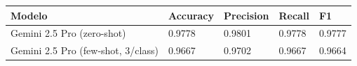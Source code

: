 \begin{tabular}{lllll}
\toprule
Modelo & Accuracy & Precision & Recall & F1 \\
\midrule
Gemini 2.5 Pro (zero-shot) & 0.9778 & 0.9801 & 0.9778 & 0.9777 \\
Gemini 2.5 Pro (few-shot, 3/class) & 0.9667 & 0.9702 & 0.9667 & 0.9664 \\
\bottomrule
\end{tabular}

